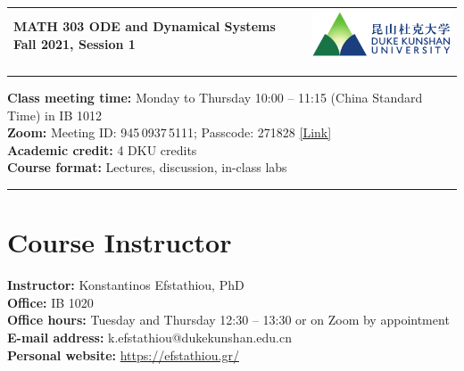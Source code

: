 \documentclass[11pt]{article}
\begin{document}

\begin{tabularx}{\textwidth}{Xm{6cm}}
\arrayrulecolor{dku-blue}\toprule\vspace{6pt}
{\bfseries\color{dku-blue}
 {\Large MATH 303} \newline\newline
 {\huge ODE and Dynamical Systems} \newline\newline
 {\Large Fall 2021, Session 1}} 
& \includegraphics[width=6cm]{dku-logo} \\
\bottomrule
\end{tabularx}

\vspace{1em}

\textcolor{dku-blue}{\rule{\textwidth}{1pt}}

\textbf{Class meeting time:} Monday to Thursday 10:00 – 11:15 (China Standard Time) in IB 1012 \\
\textbf{Zoom:} Meeting ID: 945\,0937\,5111; Passcode: 271828 \href{https://duke.zoom.us/j/94509375111?pwd=OXhnZ2hZZWUwS0JiMmFIYzJsSm4wdz09}{[Link]} \\
\textbf{Academic credit:} 4 DKU credits \\
\textbf{Course format:} Lectures, discussion, in-class labs

\vspace{-1em}\textcolor{dku-blue}{\rule{\textwidth}{1pt}}



\section{Course Instructor}

\textbf{Instructor:} Konstantinos Efstathiou, PhD \\
\textbf{Office:} IB 1020 \\
\textbf{Office hours:} Tuesday and Thursday 12:30 – 13:30 or on Zoom by appointment \\
\textbf{E-mail address:} k.efstathiou@dukekunshan.edu.cn \\
\textbf{Personal website:} \url{https://efstathiou.gr/}
\end{document}
